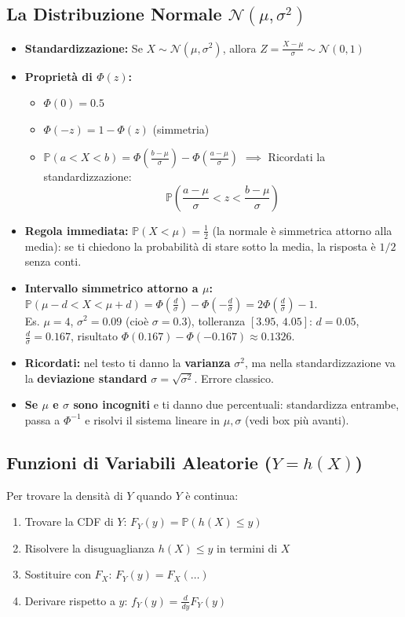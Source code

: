 \documentclass[12pt]{extarticle} %
\begin{document}
\subsection{La Distribuzione Normale $\mathcal{N}(\mu, \sigma^2)$}
\begin{itemize}
    \item \textbf{Standardizzazione:} Se $X \sim \mathcal{N}(\mu, \sigma^2)$, allora $Z = \frac{X - \mu}{\sigma} \sim \mathcal{N}(0, 1)$
    \item \textbf{Proprietà di $\Phi(z)$:}
    \begin{itemize}
        \item $\Phi(0) = 0.5$
        \item $\Phi(-z) = 1 - \Phi(z)$ (simmetria)
        \item $\mathbb{P}(a < X < b) = \Phi\left(\frac{b-\mu}{\sigma}\right) - \Phi\left(\frac{a-\mu}{\sigma}\right)$ $\implies$ Ricordati la standardizzazione: $$\mathbb{P}\left( \frac{a-\mu}{\sigma} < z < \frac{b-\mu}{\sigma}\right)$$
    \end{itemize}
    \item \textbf{Regola immediata:} $\mathbb{P}(X < \mu) = \frac12$ (la normale è simmetrica attorno alla media): se ti chiedono la probabilità di stare sotto la media, la risposta è $1/2$ senza conti.
    \item \textbf{Intervallo simmetrico attorno a $\mu$:} $\mathbb{P}(\mu - d < X < \mu + d) = \Phi\!\left(\frac{d}{\sigma}\right) - \Phi\!\left(-\frac{d}{\sigma}\right) = 2\Phi\!\left(\frac{d}{\sigma}\right) - 1$. \\ {\footnotesize Es. $\mu=4$, $\sigma^2 = 0.09$ (cioè $\sigma = 0.3$), tolleranza $[3.95,\,4.05]$: $d = 0.05$, $\frac{d}{\sigma} = 0.167$, risultato $\Phi(0.167)-\Phi(-0.167) \approx 0.1326$.}
    \item \textbf{Ricordati:} nel testo ti danno la \textbf{varianza} $\sigma^2$, ma nella standardizzazione va la \textbf{deviazione standard} $\sigma = \sqrt{\sigma^2}$. Errore classico.
    \item \textbf{Se $\mu$ e $\sigma$ sono incogniti} e ti danno due percentuali: standardizza entrambe, passa a $\Phi^{-1}$ e risolvi il sistema lineare in $\mu, \sigma$ (vedi box più avanti).
\end{itemize}

\subsection{Funzioni di Variabili Aleatorie ($Y = h(X)$)}
Per trovare la densità di $Y$ quando $Y$ è continua:
\begin{enumerate}
    \item Trovare la CDF di $Y$: $F_Y(y) = \mathbb{P}(h(X) \le y)$
    \item Risolvere la disuguaglianza $h(X) \le y$ in termini di $X$
    \item Sostituire con $F_X$: $F_Y(y) = F_X(\dots)$
    \item Derivare rispetto a $y$: $f_Y(y) = \frac{d}{dy} F_Y(y)$
\end{enumerate}
\end{document}

